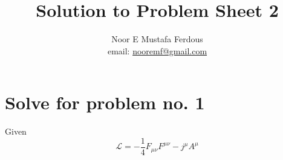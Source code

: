 \documentclass[12pt, letterpaper]{article}
\title{Solution to Problem Sheet 2}
\author{Noor E Mustafa Ferdous\\ email: \href{mailto:nooremf@gmail.com}{nooremf@gmail.com} }
\date{}
\newcommand*{\1}{\hspace{1pt}}
\begin{document}
\maketitle

\section*{Solve for problem no. 1}

Given
\begin{equation}
    \mathcal{L} = -\frac{1}{4}F_{\mu \nu} F^{\mu \nu} - j^{\mu} A^{\mu}
\end{equation}
\end{document}
